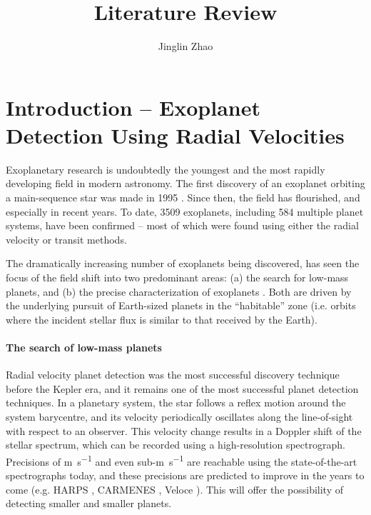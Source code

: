 \documentclass[a4paper]{article}
\title{Literature Review}
\author{Jinglin Zhao}
\begin{document}
\maketitle



\section{Introduction -- Exoplanet Detection Using Radial Velocities}

Exoplanetary research is undoubtedly the youngest and the most rapidly developing field in modern astronomy. The first discovery of an exoplanet orbiting a main-sequence star was made in 1995 \cite{Mayor1995}. Since then, the field has flourished, and especially in recent years. To date, 3509 exoplanets, including 584 multiple planet systems, have been confirmed \cite{NASAExoplanetArchive} -- most of which were found using either the radial velocity or transit methods. 

The dramatically increasing number of exoplanets being discovered, has seen the focus of the field shift into   two predominant areas: (a) the search for low-mass planets, and (b) the precise characterization of exoplanets \cite{Mayor2014Natur}. Both are driven by the underlying pursuit of Earth-sized planets in the ``habitable'' zone (i.e. orbits where the incident stellar flux is similar to that received by the Earth). 

\paragraph{The search of low-mass planets}
Radial velocity planet detection was the most successful discovery technique before the Kepler era, and it remains one of the most successful planet detection techniques. In a planetary system, the star follows
a reflex motion around the system barycentre, and its velocity periodically oscillates along the 
line-of-sight with respect to an observer. This velocity change results in a Doppler shift of the stellar spectrum, which can be recorded using a high-resolution spectrograph.
Precisions of \si{m.s^{-1}} and even sub-\si{m.s^{-1}} are reachable using the state-of-the-art 
spectrographs today, and these precisions are predicted to improve in the years to come (e.g. HARPS \cite{Mayor2003Msngr}, CARMENES \cite{Quirrenbach2014SPIE}, Veloce \cite{Tinneyveloce}). This will offer the possibility of detecting smaller and smaller planets. 
\end{document}

